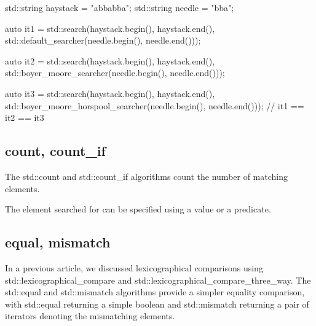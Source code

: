 \begin{box-note}
\begin{cppcode}
std::string haystack = "abbabba";
std::string needle = "bba";

auto it1 = std::search(haystack.begin(), haystack.end(), 
                       std::default_searcher(needle.begin(), needle.end()));

auto it2 = std::search(haystack.begin(), haystack.end(), 
                       std::boyer_moore_searcher(needle.begin(), needle.end()));

auto it3 = std::search(haystack.begin(), haystack.end(), 
                       std::boyer_moore_horspool_searcher(needle.begin(), needle.end()));
// it1 == it2 == it3
\end{cppcode}
\end{box-note}

\subsection{count, count\_if}

The std::count and std::count\_if algorithms count the number of matching elements.



The element searched for can be specified using a value or a predicate.

\begin{box-note}
\end{box-note}

\subsection{equal, mismatch}

In a previous article, we discussed lexicographical comparisons using std::lexicographical\_compare and std::lexicographical\_compare\_three\_way. The std::equal and std::mismatch algorithms provide a simpler equality comparison, with std::equal returning a simple boolean and std::mismatch returning a pair of iterators denoting the mismatching elements.

